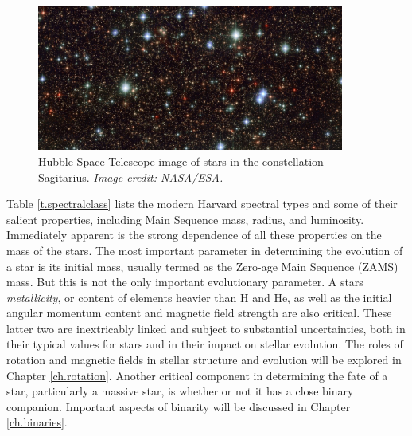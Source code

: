 \begin{figure}[ht!]
  \centering
  \includegraphics[width=0.9\textwidth]{prelim/hubble_friday_06172016}
  \caption{Hubble Space Telescope image of stars in the constellation Sagitarius. {\it Image credit: NASA/ESA.}}\label{f.hubblestars}
\end{figure}

Table \ref{t.spectralclass} lists the modern Harvard spectral types and some of their salient properties, including Main Sequence mass, radius, and luminosity.
Immediately apparent is the strong dependence of all these properties on the mass of the stars.
The most important parameter in determining the evolution of a star is its initial mass, usually termed as the Zero-age Main Sequence (ZAMS) mass.
But this is not the only important evolutionary parameter.
A stars {\it metallicity}, or content of elements heavier than H and He, as well as the initial angular momentum content and magnetic field strength are also critical.
These latter two are inextricably linked and subject to substantial uncertainties, both in their typical values for stars and in their impact on stellar evolution.
The roles of rotation and magnetic fields in stellar structure and evolution will be explored in Chapter \ref{ch.rotation}.
Another critical component in determining the fate of a star, particularly a massive star, is whether or not it has a close binary companion.
Important aspects of binarity will be discussed in Chapter \ref{ch.binaries}.


